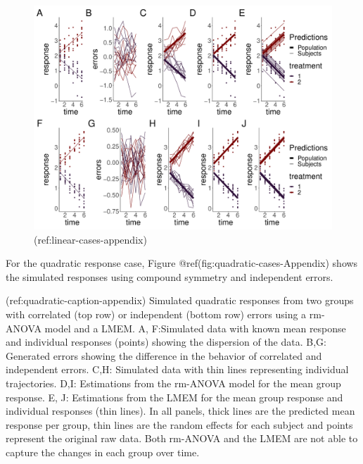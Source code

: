 \documentclass[Royal,times,sagev]{sagej}
\begin{document}
\begin{figure}
\centering
\includegraphics{Full_document_SAGE_files/figure-latex/linear-cases-Appendix-1.pdf}
\caption{(ref:linear-cases-appendix)}
\end{figure}

For the quadratic response case, Figure
@ref(fig:quadratic-cases-Appendix) shows the simulated responses using
compound symmetry and independent errors.

(ref:quadratic-caption-appendix) Simulated quadratic responses from two
groups with correlated (top row) or independent (bottom row) errors
using a rm-ANOVA model and a LMEM. A, F:Simulated data with known mean
response and individual responses (points) showing the dispersion of the
data. B,G: Generated errors showing the difference in the behavior of
correlated and independent errors. C,H: Simulated data with thin lines
representing individual trajectories. D,I: Estimations from the rm-ANOVA
model for the mean group response. E, J: Estimations from the LMEM for
the mean group response and individual responses (thin lines). In all
panels, thick lines are the predicted mean response per group, thin
lines are the random effects for each subject and points represent the
original raw data. Both rm-ANOVA and the LMEM are not able to capture
the changes in each group over time.
\end{document}
